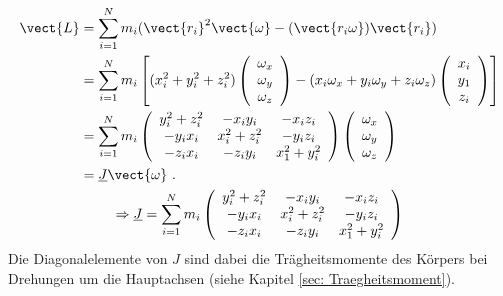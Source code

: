 \begin{gather}
    \begin{aligned}
    \vect{L}&=\sum_{i=1}^{N} m_i (\vect{r_i}^2\vect{\omega}-(\vect{r_i\omega})\vect{r_i})\\
            &=\sum_{i=1}^{N} m_i\left[(x_i^2+y_i^2+z_i^2)
              \left(\begin{array}{c} \omega_x \\ \omega_y \\ \omega_z \end{array}\right)
              - (x_i\omega_x+y_i\omega_y+z_i\omega_z)
              \left(\begin{array}{c} x_i \\ y_1 \\ z_i \end{array}\right)\right]\\
            &=\sum_{i=1}^{N} m_i
              \left(\begin{array}{ccc} y_i^2+z_i^2 & -x_iy_i & -x_iz_i \\ -y_ix_i & x_i^2+z_i^2 & -y_iz_i \\ -z_ix_i & -z_iy_i & x_1^2+y_i^2 \end{array}\right) 
              \left(\begin{array}{c} \omega_x \\ \omega_y \\ \omega_z \end{array}\right) \\
            &=\underline{J}\vect{\omega}~.
    \end{aligned} \\
    \Rightarrow \underline{J} = \sum_{i=1}^{N} m_i
                                \left(\begin{array}{ccc} y_i^2+z_i^2 & -x_iy_i & -x_iz_i \\ -y_ix_i & x_i^2+z_i^2 & -y_iz_i \\ -z_ix_i & -z_iy_i & x_1^2+y_i^2 \end{array}\right)
\end{gather}
Die Diagonalelemente von $J$ sind dabei die Trägheitsmomente des Körpers bei Drehungen um die Hauptachsen (siehe Kapitel \ref{sec: Traegheitsmoment}).